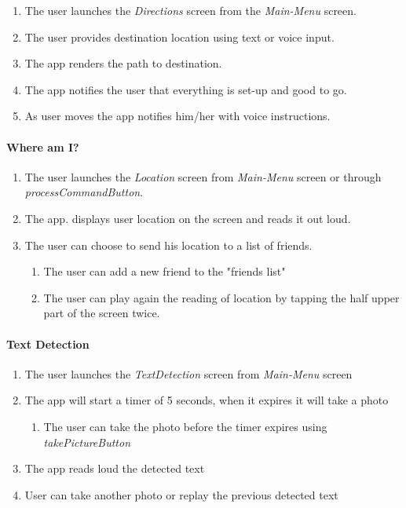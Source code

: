 \documentclass{article}[11]
\begin{document}
	\begin{enumerate}
		\item The user launches the \emph{Directions} screen from the \emph{Main-Menu} screen.
		\item The user provides destination location using text or voice input.
		\item The app renders the path to destination.
		\item The app notifies the user that everything is set-up and good to go.
		\item As user moves the app notifies him/her with voice instructions.
	\end{enumerate}
		
	\paragraph{Where am I?}

	\begin{enumerate}
		\item The user launches the \emph{Location} screen from \emph{Main-Menu} screen or through \emph{processCommandButton}.
		
		\item The app. displays user location on the screen and reads it out loud.
		
		\item The user can choose to send his location to a list of friends.
		\begin{enumerate}
			\item The user can add a new friend to the "friends list"
			\item The user can play again the reading of location by  tapping the half upper part of the screen twice.	
		\end{enumerate}
					

	\end{enumerate}			
	
	
	\paragraph{Text Detection}

		\begin{enumerate}
			\item The user launches the \emph{TextDetection} screen from \emph{Main-Menu} screen
			
			\item The app will start a timer of 5 seconds, when it expires it will take a photo
				\begin{enumerate}
					\item The user can take the photo before the timer expires using \emph{takePictureButton} 				
				
				\end{enumerate}
			
			\item The app reads loud the detected text
			
			\item User can take another photo or replay the previous detected text
						
		\end{enumerate}			
	
\end{document}
